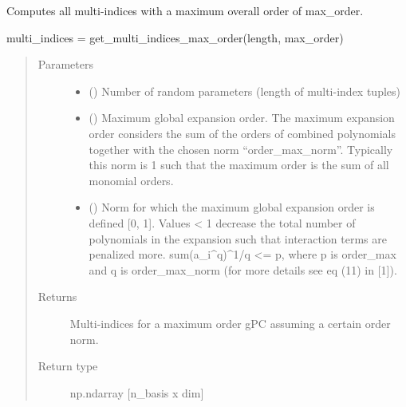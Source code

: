 \documentclass[letterpaper,10pt,english,openany,oneside]{sphinxmanual}
\begin{document}
\begin{fulllineitems}
\label{\detokenize{pygpc:pygpc.misc.get_multi_indices_max_order}}
Computes all multi-indices with a maximum overall order of max\_order.

multi\_indices = get\_multi\_indices\_max\_order(length, max\_order)
\begin{quote}\begin{description}
\item[{Parameters}] \leavevmode\begin{itemize}
\item {} 
 () \textendash{} Number of random parameters (length of multi-index tuples)

\item {} 
 () \textendash{} Maximum global expansion order.
The maximum expansion order considers the sum of the orders of combined polynomials together with the
chosen norm “order\_max\_norm”. Typically this norm is 1 such that the maximum order is the sum of all
monomial orders.

\item {} 
 () \textendash{} Norm for which the maximum global expansion order is defined {[}0, 1{]}. Values \textless{} 1 decrease the total number
of polynomials in the expansion such that interaction terms are penalized more.
sum(a\_i\textasciicircum{}q)\textasciicircum{}1/q \textless{}= p, where p is order\_max and q is order\_max\_norm (for more details see eq (11) in {[}1{]}).

\end{itemize}

\item[{Returns}] \leavevmode
{} \textendash{} Multi-indices for a maximum order gPC assuming a certain order norm.

\item[{Return type}] \leavevmode
np.ndarray {[}n\_basis x dim{]}

\end{description}\end{quote}

\end{fulllineitems}
\end{document}
